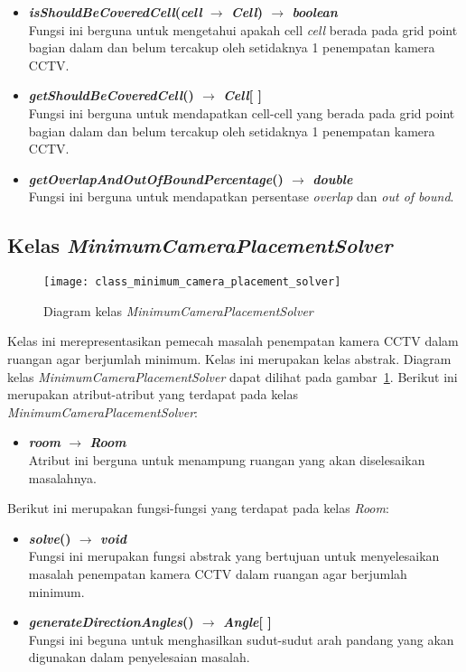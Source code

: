 \begin{itemize}
	Fungsi ini berguna untuk mendapatkan cell-cell yang berada pada grid point bagian dalam dan telah tercakup oleh setidaknya 1 penempatan kamera CCTV.
	\item \textbf{\textit{isShouldBeCoveredCell}(\textit{cell} \(\rightarrow\) \textit{Cell}) \(\rightarrow\) \textit{boolean}}\\
	Fungsi ini berguna untuk mengetahui apakah cell \textit{cell} berada pada grid point bagian dalam dan belum tercakup oleh setidaknya 1 penempatan kamera CCTV.
	\item \textbf{\textit{getShouldBeCoveredCell}() \(\rightarrow\) \textit{Cell}[ ]}\\
	Fungsi ini berguna untuk mendapatkan cell-cell yang berada pada grid point bagian dalam dan belum tercakup oleh setidaknya 1 penempatan kamera CCTV.
	\item \textbf{\textit{getOverlapAndOutOfBoundPercentage}() \(\rightarrow\) \textit{double}}\\
	Fungsi ini berguna untuk mendapatkan persentase \textit{overlap} dan \textit{out of bound}.
\end{itemize}

\subsection{Kelas \textit{MinimumCameraPlacementSolver}}
\begin{figure}[H]
	\centering  
	\texttt{[image: class\_minimum\_camera\_placement\_solver]}
	\caption[Diagram kelas \textit{MinimumCameraPlacementSolver}]{Diagram kelas \textit{MinimumCameraPlacementSolver}}
	\label{fig:class_minimum_camera_placement_solver}
\end{figure}

Kelas ini merepresentasikan pemecah masalah penempatan kamera CCTV dalam ruangan agar berjumlah minimum. Kelas ini merupakan kelas abstrak. Diagram kelas \textit{MinimumCameraPlacementSolver} dapat dilihat pada gambar~\ref{fig:class_minimum_camera_placement_solver}. Berikut ini merupakan atribut-atribut yang terdapat pada kelas \textit{MinimumCameraPlacementSolver}:
\begin{itemize}
	\item \textbf{\textit{room} \(\rightarrow\) \textit{Room}}\\
	Atribut ini berguna untuk menampung ruangan yang akan diselesaikan masalahnya.
\end{itemize}

Berikut ini merupakan fungsi-fungsi yang terdapat pada kelas \textit{Room}:
\begin{itemize}
	\item \textbf{\textit{solve}() \(\rightarrow\) \textit{void}}\\
	Fungsi ini merupakan fungsi abstrak yang bertujuan untuk menyelesaikan masalah penempatan kamera CCTV dalam ruangan agar berjumlah minimum.
	\item \textbf{\textit{generateDirectionAngles}() \(\rightarrow\) \textit{Angle}[ ]}\\
	Fungsi ini beguna untuk menghasilkan sudut-sudut arah pandang yang akan digunakan dalam penyelesaian masalah.
\end{itemize}

